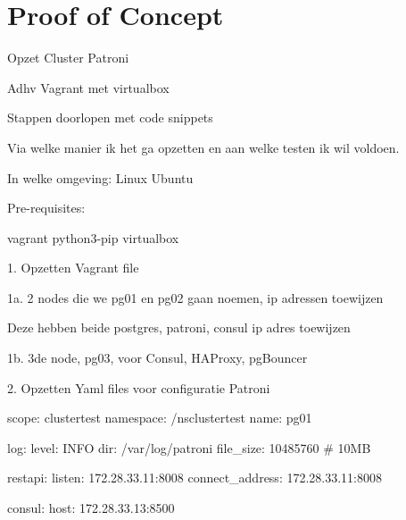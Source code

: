 
\chapter{Proof of Concept}

\label{ch:Proof of Concept}



Opzet Cluster Patroni

Adhv Vagrant met virtualbox

Stappen doorlopen met code snippets

Via welke manier ik het ga opzetten en aan welke testen ik wil voldoen.

In welke omgeving: Linux Ubuntu

Pre-requisites:

vagrant
python3-pip
virtualbox


1. Opzetten Vagrant file

1a. 2 nodes die we pg01 en pg02 gaan noemen, ip adressen toewijzen

Deze hebben beide postgres, patroni, consul
ip adres toewijzen

1b. 3de node, pg03, voor Consul, HAProxy, pgBouncer


2. Opzetten Yaml files voor configuratie Patroni

scope: clustertest
namespace: /nsclustertest
name: pg01

log:
level: INFO
dir: /var/log/patroni
file_size: 10485760 # 10MB

restapi:
listen: 172.28.33.11:8008
connect_address: 172.28.33.11:8008

consul:
host: 172.28.33.13:8500

